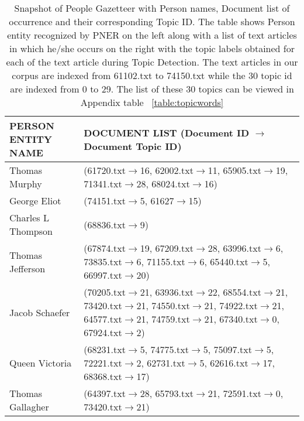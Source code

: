 \begin{table*}
\caption{Snapshot of People Gazetteer with Person names, Document list of occurrence and their corresponding Topic ID. The table shows Person entity recognized by PNER on the left along with a list of text articles in which he/she occurs on the right with the topic labels obtained for each of the text article during Topic Detection. The text articles in our corpus are indexed from 61102.txt to 74150.txt while the 30 topic id are indexed from 0 to 29. The list of these 30 topics can be viewed in Appendix table ~\ref{table:topicwords}}
\label{table:gaz}
\resizebox{16cm}{!} {
 
   \begin{tabular}{|p{2cm}|p{15cm}|}

    \hline
    PERSON ENTITY NAME & DOCUMENT LIST (Document ID $\rightarrow$  Document Topic ID)\\ \hline
    Thomas Murphy        & (61720.txt$\rightarrow$16, 62002.txt$\rightarrow$11, 65905.txt$\rightarrow$19, 71341.txt$\rightarrow$28, 68024.txt$\rightarrow$16)                        \\ \hline
    George Eliot       & (74151.txt$\rightarrow$5, 61627$\rightarrow$15)                                                                                      \\ \hline
    Charles L Thompson        & (68836.txt$\rightarrow$9)                                                                         \\ \hline
    Thomas Jefferson       & (67874.txt$\rightarrow$19, 67209.txt$\rightarrow$28, 63996.txt$\rightarrow$6, 73835.txt$\rightarrow$6, 71155.txt$\rightarrow$6, 65440.txt$\rightarrow$5, 66997.txt$\rightarrow$20)                   \\ \hline
    Jacob Schaefer        & (70205.txt$\rightarrow$21, 63936.txt$\rightarrow$22, 68554.txt$\rightarrow$21, 73420.txt$\rightarrow$21, 74550.txt$\rightarrow$21, 74922.txt$\rightarrow$21, 64577.txt$\rightarrow$21, 74759.txt$\rightarrow$21, 67340.txt$\rightarrow$0, 67924.txt$\rightarrow$2)                   \\ \hline
    Queen Victoria       & (68231.txt$\rightarrow$5, 74775.txt$\rightarrow$5, 75097.txt$\rightarrow$5, 72221.txt$\rightarrow$2, 62731.txt$\rightarrow$5, 62616.txt$\rightarrow$17, 68368.txt$\rightarrow$17)                                      \\ \hline
    Thomas Gallagher        & (64397.txt$\rightarrow$28, 65793.txt$\rightarrow$21, 72591.txt$\rightarrow$0, 73420.txt$\rightarrow$21) \\ \hline

\end{tabular}}
\end{table*}
